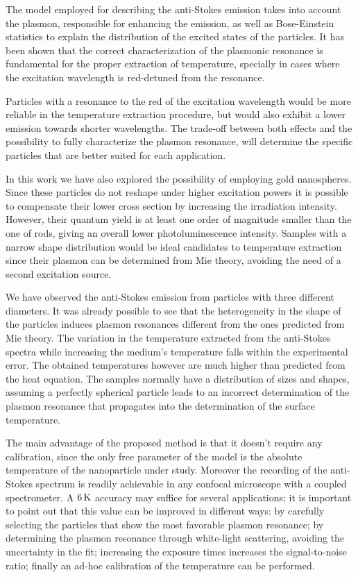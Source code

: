 The model employed for describing the anti-Stokes emission takes into account
the plasmon, responsible for enhancing the emission, as well as Bose-Einstein
statistics to explain the distribution of the excited states of the particles.
It has been shown that the correct characterization of the plasmonic resonance is
fundamental for the proper extraction of temperature, specially in cases
where the excitation wavelength is red-detuned from the resonance.

Particles with a resonance to the red of the excitation wavelength would be more
reliable in the temperature extraction procedure, but would also exhibit a lower
emission towards shorter wavelengths. The trade-off between both effects and
the possibility to fully characterize the plasmon resonance, will determine the
specific particles that are better suited for each application.

In this work we have also explored the possibility of employing gold
nanospheres. Since these particles do not reshape under higher excitation powers
it is possible to compensate their lower cross section by increasing the
irradiation intensity. However, their quantum yield is at least one order of
magnitude smaller than the one of rods, giving an overall lower
photoluminescence intensity. Samples with a narrow shape distribution would be
ideal candidates to temperature extraction since their plasmon can be determined
from Mie theory, avoiding the need of a second excitation source.

We have observed the anti-Stokes emission from particles with three different
diameters. It was already possible to see that the heterogeneity in the shape of
the particles induces plasmon resonances different from the ones predicted from
Mie theory. The variation in the temperature extracted from the anti-Stokes
spectra while increasing the medium's temperature falls within the experimental
error. The obtained temperatures however are much higher than predicted from the
heat equation. The samples normally have a distribution of sizes and shapes,
assuming a perfectly spherical particle leads to an incorrect determination of
the plasmon resonance that propagates into the determination of the surface
temperature. 

The main advantage of the proposed method is that it doesn't require any
calibration, since the only free parameter of the model is the absolute
temperature of the nanoparticle under study. Moreover the recording of the
anti-Stokes spectrum is readily achievable in any confocal microscope with a
coupled spectrometer. A $6\,\textrm{K}$ accuracy may suffice for several applications; it
is important to point out that this value can be improved in different ways: by
carefully selecting the particles that show the most favorable plasmon
resonance; by determining the plasmon resonance through white-light scattering,
avoiding the uncertainty in the fit; increasing the exposure times increases the
signal-to-noise ratio; finally an ad-hoc calibration of the temperature can
be performed.


